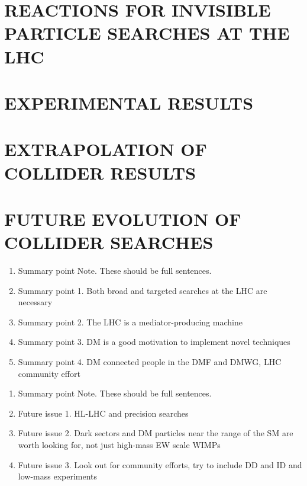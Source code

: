 \documentclass{ar-1col}
\begin{document}
\section{REACTIONS FOR INVISIBLE PARTICLE SEARCHES AT THE LHC}
\label{sec:02_Reactions}



\section{EXPERIMENTAL RESULTS}



\section{EXTRAPOLATION OF COLLIDER RESULTS}

\section{FUTURE EVOLUTION OF COLLIDER SEARCHES}
\label{sec:05_Future}

\clearpage


\begin{summary}
\begin{enumerate}
\item Summary point Note. These should be full sentences.
\item Summary point 1. Both broad and targeted searches at the LHC are necessary
\item Summary point 2. The LHC is a mediator-producing machine
\item Summary point 3. DM is a good motivation to implement novel techniques 
\item Summary point 4. DM connected people in the DMF and DMWG, LHC community effort 
\end{enumerate}
\end{summary}

\begin{issues}
\begin{enumerate}
\item Summary point Note. These should be full sentences.
\item Future issue 1. HL-LHC and precision searches
\item Future issue 2. Dark sectors and DM particles near the range of the SM are worth looking for, not just high-mass EW scale WIMPs
\item Future issue 3. Look out for community efforts, try to include DD and ID and low-mass experiments 
\end{enumerate}
\end{issues}
\end{document}
